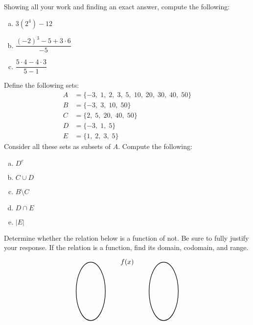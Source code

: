 \documentclass[12pt,letterpaper]{exam}
\begin{document}
\examtitle
{} 
\scores
\newpage

\begin{questions}

\newpage
\question[10] Showing all your work and finding an exact answer, compute the following:
	\begin{enumerate}[(a)]
	\item $3 (2^4) - 12$
	\item $\dfrac{(-2)^3 - 5 + 3 \cdot 6}{-5}$
	\item $\dfrac{5 \cdot 4 - 4 \cdot 3}{5 - 1}$
	\end{enumerate}



\newpage
\question[10] Define the following sets:
	\[
	\begin{aligned}
	A&= \{ -3,\; 1, \; 2,\; 3,\; 5,\; 10,\; 20,\; 30,\; 40,\; 50 \} \\
	B&= \{ -3,\; 3,\; 10,\; 50 \} \\
	C&= \{ 2,\; 5,\; 20,\; 40,\; 50 \} \\
	D&= \{ -3,\; 1,\; 5 \} \\
	E&= \{ 1,\; 2,\; 3,\; 5 \}
	\end{aligned}
	\]
Consider all these sets as subsets of $A$. Compute the following:
	\begin{enumerate}[(a)]
	\item $D^c$
	\item $C \cup D$
	\item $B \setminus C$
	\item $D \cap E$
	\item $|E|$
	\end{enumerate}



\newpage
\question[10] Determine whether the relation below is a function of not. Be sure to fully justify your response. If the relation is a function, find its domain, codomain, and range. 
	\[
	\begin{tikzpicture}[scale=0.75]
	\node at (2.5,2) {$f(x)$};
	\draw[line width=0.03cm] (0,0) circle (1 and 2);
	\draw[line width=0.03cm] (5,0) circle (1 and 2);
	

\end{tikzpicture}\]
\end{questions}
\end{document}
